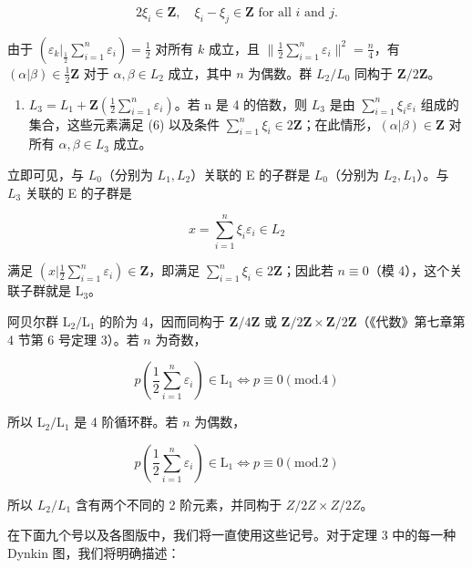 \[
2 \xi_ {i} \in \mathbf {Z}, \quad \xi_ {i} - \xi_ {j} \in \mathbf {Z} \text {   for   all   } i \text {   and   } j.\tag{6}
\]

由于 \((\varepsilon_k|_{\frac{1}{2}}\sum_{i=1}^{n}\varepsilon_i) = \frac{1}{2}\) 对所有 \(k\) 成立，且 \(\| \frac{1}{2}\sum_{i=1}^{n}\varepsilon_i\|^2 = \frac{n}{4}\)，有 \((\alpha|\beta) \in \frac{1}{2}\mathbf{Z}\) 对于 \(\alpha, \beta \in L_2\) 成立，其中 \(n\) 为偶数。群 \(L_2 / L_0\) 同构于 \(\mathbf{Z}/2\mathbf{Z}\)。

\begin{enumerate}
\def\labelenumi{\arabic{enumi})}
\setcounter{enumi}{3}
\tightlist
\item
  \(L_{3} = L_{1} + \mathbf{Z}\left(\frac{1}{2} \sum_{i=1}^{n} \varepsilon_{i}\right)\)。若 n 是 4 的倍数，则 \(L_{3}\) 是由 \(\sum_{i=1}^{n} \xi_{i} \varepsilon_{i}\) 组成的集合，这些元素满足 (6) 以及条件 \(\sum_{i=1}^{n} \xi_{i} \in 2\mathbf{Z}\)；在此情形，\((\alpha | \beta) \in \mathbf{Z}\) 对所有 \(\alpha, \beta \in L_{3}\) 成立。
\end{enumerate}

立即可见，与 \(L_{0}\)（分别为 \(L_{1}, L_{2}\)）关联的 E 的子群是 \(L_{0}\)（分别为 \(L_{2}, L_{1}\)）。与 \(L_{3}\) 关联的 E 的子群是

\[
x = \sum_ {i = 1} ^ {n} \xi_ {i} \varepsilon_ {i} \in L _ {2}
\]

满足 \((x|\frac{1}{2}\sum_{i = 1}^{n}\varepsilon_i)\in \mathbf{Z}\)，即满足 \(\sum_{i = 1}^{n}\xi_{i}\in 2\mathbf{Z}\)；因此若 \(n\equiv 0\)（模 4），这个关联子群就是 \(\mathrm{L}_3\)。

阿贝尔群 \(\mathrm{L}_2 / \mathrm{L}_1\) 的阶为 4，因而同构于 \(\mathbf{Z} / 4\mathbf{Z}\) 或 \(\mathbf{Z} / 2\mathbf{Z} \times \mathbf{Z} / 2\mathbf{Z}\)（《代数》第七章第 4 节第 6 号定理 3）。若 \(n\) 为奇数，

\[
p (\frac {1}{2} \sum_ {i = 1} ^ {n} \varepsilon_ {i}) \in \mathrm{L} _ {1} \Leftrightarrow p \equiv 0 (\mathrm{mod.} 4)
\]

所以 \(\mathrm{L}_2 / \mathrm{L}_1\) 是 4 阶循环群。若 \(n\) 为偶数，

\[
p (\frac {1}{2} \sum_ {i = 1} ^ {n} \varepsilon_ {i}) \in \mathrm{L} _ {1} \Leftrightarrow p \equiv 0 (\mathrm{mod.} 2)
\]

所以 \(L_{2}/L_{1}\) 含有两个不同的 2 阶元素，并同构于 \(Z/2Z \times Z/2Z\)。

在下面九个号以及各图版中，我们将一直使用这些记号。对于定理 3 中的每一种 Dynkin 图，我们将明确描述：


